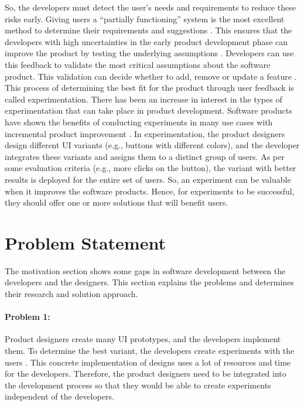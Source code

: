 So, the developers must detect the user's needs and requirements to reduce these risks early.
Giving users a ``partially functioning'' system is the most excellent method to determine their requirements and suggestions \cite{journal:prototyping:davis}.
This ensures that the developers with high uncertainties in the early product development phase can improve the product by testing the underlying assumptions \cite{misc:lean:steve}.
Developers can use this feedback to validate the most critical assumptions about the software product. 
This validation can decide whether to add, remove or update a feature \cite{article:experiments:lindgren}. 
This process of determining the best fit for the product through user feedback is called experimentation.
There has been an increase in interest in the types of experimentation that can take place in product development. 
Software products have shown the benefits of conducting experiments in many use cases with incremental product improvement \cite{article:controlled:experiements}.
In experimentation, the product designers design different UI variants (e.g., buttons with different colors), and the developer integrates these variants and assigns them to a distinct group of users. 
As per some evaluation criteria (e.g., more clicks on the button), the variant with better results is deployed for the entire set of users.
So, an experiment can be valuable when it improves the software products.
Hence, for experiments to be successful, they should offer one or more solutions that will benefit users.
\clearpage
\section{Problem Statement} %
\label{introduction:section:problems}
The motivation section shows some gaps in software development between the developers and the designers.
This section explains the problems and determines their research and solution approach.

\paragraph{Problem 1:} Product designers create many UI prototypes, and the developers implement them.
To determine the best variant, the developers create experiments with the users \cite{article:experiments:lindgren}. 
This concrete implementation of designs uses a lot of resources and time for the developers.
Therefore, the product designers need to be integrated into the development process so that they would be able to create experiments independent of the developers.

